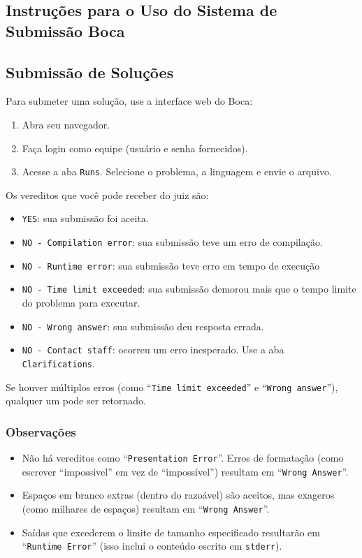 \documentclass{article}
\begin{document}
\begin{titlepage}
\section{Instruções para o Uso do Sistema de Submissão Boca}

\subsection{Submissão de Soluções}

Para submeter uma solução, use a interface web do Boca:
\begin{enumerate}
    \item Abra seu navegador.
    \item Faça login como equipe (usuário e senha fornecidos).
    \item Acesse a aba \texttt{Runs}. Selecione o problema, a linguagem e envie o arquivo.
\end{enumerate}

\noindent Os vereditos que você pode receber do juiz são:

\begin{itemize}
    \item \texttt{YES}: sua submissão foi aceita.
    \item \texttt{NO - Compilation error}: sua submissão teve um erro de compilação.
    \item \texttt{NO - Runtime error}: sua submissão teve erro em tempo de execução
    \item \texttt{NO - Time limit exceeded}: sua submissão demorou mais que o tempo limite do problema para executar.
    \item \texttt{NO - Wrong answer}: sua submissão deu resposta errada.
    \item \texttt{NO - Contact staff}: ocorreu um erro inesperado. Use a aba \texttt{Clarifications}.
\end{itemize}

\noindent Se houver múltiplos erros (como ``\texttt{Time limit exceeded}'' e ``\texttt{Wrong answer}''), qualquer um pode ser retornado.

\subsubsection{Observações}

\begin{itemize}
    \item Não há vereditos como ``\texttt{Presentation Error}''. Erros de formatação (como escrever ``impossivel'' em vez de ``impossível'') resultam em ``\texttt{Wrong Answer}''.
    \item Espaços em branco extras (dentro do razoável) são aceitos, mas exageros (como milhares de espaços) resultam em ``\texttt{Wrong Answer}''.
    \item Saídas que excederem o limite de tamanho especificado resultarão em ``\texttt{Runtime Error}'' (isso inclui o conteúdo escrito em \texttt{stderr}).
\end{itemize}


\end{titlepage}
\end{document}
